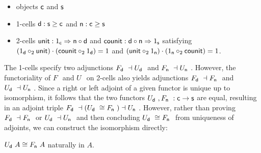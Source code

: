 \documentclass{drl-common/llncs}
\newcommand{\la}{\ensuremath{\dashv}}
\newcommand{\tc}[2]{\ensuremath{#1 \Rightarrow #2}}
\newcommand\compo[2]{\ensuremath{#1 \circ #2}}
\newcommand\compv[2]{\ensuremath{#1 \cdot #2}}
\newcommand\comph[2]{\ensuremath{#1 \mathbin{\circ_2} #2}}
\newcommand\F[2]{\ensuremath{F_{#1} \,\, #2}}
\newcommand\U[2]{\ensuremath{U_{#1} \,\, #2}}
\begin{document}
\begin{itemize}
\item objects $\mathsf{c}$ and $\mathsf{s}$
\item 1-cells $\mathsf{d} : \mathsf{s} \ge \mathsf{c}$ and $\mathsf{n} : \mathsf{c} \ge
  \mathsf{s}$
\item 2-cells $\dsd{unit} : \tc {1_{\dsd c}} {\compo{\dsd{n}} {\dsd{d}}}$ 
and $\dsd{counit} : \tc {\compo{\dsd{d}} {\dsd{n}}} {1_{\dsd s}}$ satisfying \\
$\compv{(\comph{1_{\dsd{d}}}{\dsd{unit}})}{(\comph{\dsd{counit}}{1_{\dsd d}})} = 1$
and 
$\compv{(\comph{\dsd{unit}}{1_{\dsd{n}}})}{(\comph{1_{\dsd n}}{\dsd{counit}})} = 1$.
\end{itemize}
\noindent
The 1-cells specify two adjunctions $\F{\dsd d}{} \la \U{\dsd d}{}$ and
$\F{\dsd n}{} \la \U{\dsd n}{}$.  However, the functoriality of $\F{}{}$
and $\U{}{}$ on 2-cells also yields adjunctions $\F{\dsd d}{} \la
\F{\dsd n}{}$ and $\U{\dsd d}{} \la \U{\dsd n}{}$.  Since a right or
left adjoint of a given functor is unique up to isomorphism, it follows
that the two functors $\U{\dsd d}{},\F{\dsd n}{} : \dsd c \to \dsd s$
are equal, resulting in an adjoint triple $\F{\dsd d}{} \la (\U{\dsd
  d}{} \iso \F{\dsd{n}}{}) \la \U{\dsd{n}}{}$.  However, rather than
proving $\F{\dsd d}{} \la \F{\dsd n}{}$ or $\U{\dsd d}{} \la \U{\dsd
  n}{}$ and then concluding $\U{\dsd d}{} \iso \F{\dsd n}{}$ from
uniqueness of adjoints, we can construct the isomorphism directly:

\begin{lemma} \label{lem:mergeFU}
$\U{\dsd d}{A} \iso \F{\dsd n}{A}$ naturally in $A$.
\end{lemma}
\end{document}
